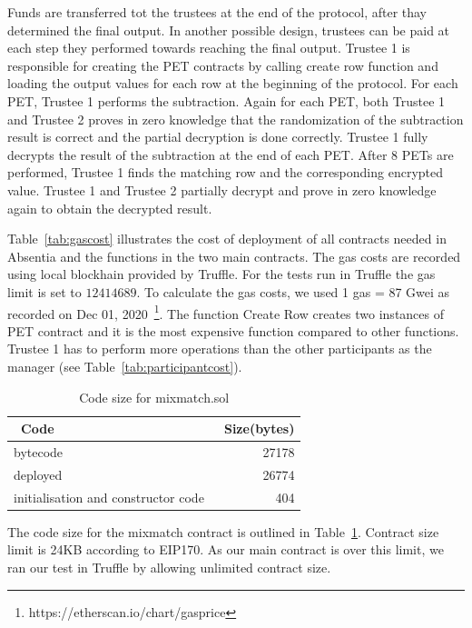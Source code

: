 
Funds are transferred tot the trustees at the end of the protocol, after thay determined the final output. In another possible design, trustees can be paid at each step they performed towards reaching the final output.
Trustee 1 is responsible for creating the PET contracts by calling create row function and loading the output values for each row at the beginning of the protocol. For each PET, Trustee 1 performs the subtraction. Again for each PET, both Trustee 1 and Trustee 2 proves in zero knowledge that the randomization of the subtraction result is correct and the partial decryption is done correctly. Trustee 1 fully decrypts the result of the subtraction at the end of each PET. After 8 PETs are performed, Trustee 1 finds the matching row and the corresponding encrypted value. Trustee 1 and Trustee 2 partially decrypt and prove in zero knowledge again to obtain the decrypted result.

Table~\ref{tab:gascost} illustrates the cost of deployment of all contracts needed in Absentia and the functions in the two main contracts. The gas costs are recorded using local blockhain provided by Truffle. For the tests run in Truffle the gas limit is set to $12414689$. To calculate the gas costs, we used 1 gas = 87 Gwei as recorded on Dec 01, 2020~\footnote{https://etherscan.io/chart/gasprice}. The function Create Row creates two instances of PET contract and it is the most expensive function compared to other functions. Trustee 1 has to perform more operations than the other participants as the manager (see Table~\ref{tab:participantcost}).

\begin{table}[!h]
	\centering
	\begin{tabular}{|l|r|}
		\hline
		~\textbf{Code}	& ~\textbf{Size(bytes)}  \\ \hline
		bytecode	& 27178  \\ \hline
		deployed	& 26774  \\ \hline
		initialisation and constructor code 	& 404 \\ \hline
	\end{tabular}
	\caption{Code size for mixmatch.sol}
	\label{tab:codesize}
\end{table}

The code size for the mixmatch contract is outlined in Table~\ref{tab:codesize}. Contract size limit is 24KB according to EIP170. As our main contract is over this limit, we ran our test in Truffle by allowing unlimited contract size.

